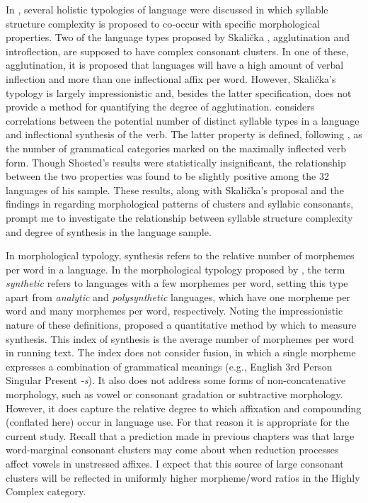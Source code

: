   In , several holistic typologies of language were discussed in which syllable structure complexity is proposed to co-occur with specific morphological properties. Two of the language types proposed by Skalička , agglutination and introflection, are supposed to have complex consonant clusters. In one of these, agglutination, it is proposed that languages will have a high amount of verbal inflection and more than one inflectional affix per word. However, Skalička’s typology is largely impressionistic and, besides the latter specification, does not provide a method for quantifying the degree of agglutination. \citet{Shosted2006} considers correlations between the potential number of distinct syllable types in a language and inflectional synthesis of the verb. The latter property is defined, following \citet{BickelNichols2005}, as the number of grammatical categories marked on the maximally inflected verb form. Though Shosted’s results were statistically insignificant, the relationship between the two properties was found to be slightly positive among the 32 languages of his sample. These results, along with Skalička’s proposal and the findings in  regarding morphological patterns of clusters and syllabic consonants, prompt me to investigate the relationship between syllable structure complexity and degree of synthesis in the language sample.

  In morphological typology, synthesis refers to the relative number of morphemes per word in a language. In the morphological typology proposed by \citet{Sapir1921}, the term \textit{synthetic} refers to languages with a few morphemes per word, setting this type apart from \textit{analytic} and \textit{polysynthetic} languages, which have one morpheme per word and many morphemes per word, respectively. Noting the impressionistic nature of these definitions, \citet{Greenberg1954} proposed a quantitative method by which to measure synthesis. This index of synthesis is the average number of morphemes per word in running text. The index does not consider fusion, in which a single morpheme expresses a combination of grammatical meanings (e.g., English 3rd Person Singular Present \textit{-s}). It also does not address some forms of non-concatenative morphology, such as vowel or consonant gradation or subtractive morphology. However, it does capture the relative degree to which affixation and compounding (conflated here) occur in language use. For that reason it is appropriate for the current study. Recall that a prediction made in previous chapters was that large word-marginal consonant clusters may come about when reduction processes affect vowels in unstressed affixes. I expect that this source of large consonant clusters will be reflected in uniformly higher morpheme/word ratios in the Highly Complex category.

